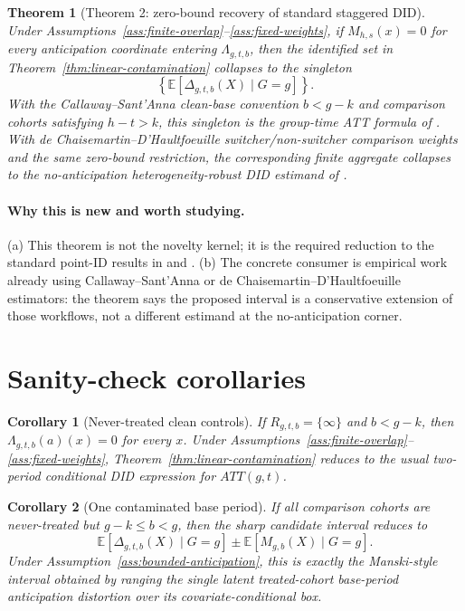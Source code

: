 \documentclass[11pt]{article}
\newcommand{\E}{\mathbb{E}}
\theoremstyle{definition}
\theoremstyle{plain}
\newtheorem{theorem}{Theorem}
\newtheorem{corollary}{Corollary}
\theoremstyle{remark}
\begin{document}
\begin{theorem}[Theorem 2: zero-bound recovery of standard staggered DID]\label{thm:zero-bound-recovery}
Under Assumptions~\ref{ass:finite-overlap}--\ref{ass:fixed-weights}, if \(M_{h,s}(x)=0\) for every anticipation coordinate entering \(\Lambda_{g,t,b}\), then the identified set in Theorem~\ref{thm:linear-contamination} collapses to the singleton
\[
  \left\{\E[\Delta_{g,t,b}(X)\mid G=g]\right\}.
\]
With the Callaway--Sant'Anna clean-base convention \(b<g-k\) and comparison cohorts satisfying \(h-t>k\), this singleton is the group-time ATT formula of \citet{CallawaySantAnna2021}.  With de Chaisemartin--D'Haultfoeuille switcher/non-switcher comparison weights and the same zero-bound restriction, the corresponding finite aggregate collapses to the no-anticipation heterogeneity-robust DID estimand of \citet{DCDH2020}.
\end{theorem}
\paragraph{Why this is new and worth studying.}
(a) This theorem is not the novelty kernel; it is the required reduction to the standard point-ID results in \citet{CallawaySantAnna2021} and \citet{DCDH2020}.  (b) The concrete consumer is empirical work already using Callaway--Sant'Anna or de Chaisemartin--D'Haultfoeuille estimators: the theorem says the proposed interval is a conservative extension of those workflows, not a different estimand at the no-anticipation corner.

\section{Sanity-check corollaries}
\begin{corollary}[Never-treated clean controls]\label{cor:never-clean}
If \(R_{g,t,b}=\{\infty\}\) and \(b<g-k\), then \(\Lambda_{g,t,b}(a)(x)=0\) for every \(x\).  Under Assumptions~\ref{ass:finite-overlap}--\ref{ass:fixed-weights}, Theorem~\ref{thm:linear-contamination} reduces to the usual two-period conditional DID expression for \(ATT(g,t)\).
\end{corollary}

\begin{corollary}[One contaminated base period]\label{cor:single-base}
If all comparison cohorts are never-treated but \(g-k\le b<g\), then the sharp candidate interval reduces to
\[
  \E[\Delta_{g,t,b}(X)\mid G=g]\pm \E[M_{g,b}(X)\mid G=g].
\]
Under Assumption~\ref{ass:bounded-anticipation}, this is exactly the Manski-style interval obtained by ranging the single latent treated-cohort base-period anticipation distortion over its covariate-conditional box.
\end{corollary}
\end{document}
